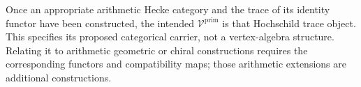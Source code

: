 Once an appropriate arithmetic Hecke category and the trace of its
identity functor have been constructed, the intended
\(\mathcal V^{\mathrm{prim}}\) is that Hochschild trace object.
This specifies its proposed categorical carrier, not a vertex-algebra
structure. Relating it to arithmetic geometric or chiral constructions
requires the corresponding functors and compatibility maps; those
arithmetic extensions are additional constructions.
